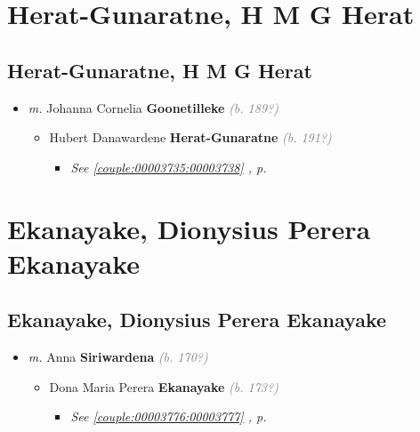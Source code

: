 \documentclass[10pt, openany]{book}
\begin{document}
\part{Herat-Gunaratne, H M G Herat}
\chapter{Herat-Gunaratne, H M G Herat}
\label{00003739}
\textcolor{slmaroon}{\textit{}}
\begin{itemize}
\item{\textit{m.} Johanna Cornelia \textbf{Goonetilleke} \textcolor{gray}{\textit{(b. 189?)}}   \label{couple:00003739:00003740} \begin{itemize}
\item{Hubert Danawardene \textbf{Herat-Gunaratne} \textcolor{gray}{\textit{(b. 191?)}}
\begin{itemize}
\item{\textcolor{slteal}{\textit{See  \autoref{couple:00003735:00003738} \textit{, p. \pageref{couple:00003735:00003738} }}}}
\end{itemize}
  }
\end{itemize}}
\end{itemize}
    
\part{Ekanayake, Dionysius Perera Ekanayake}
\chapter{Ekanayake, Dionysius Perera Ekanayake}
\label{00003778}
\textcolor{slmaroon}{\textit{}}
\begin{itemize}
\item{\textit{m.} Anna \textbf{Siriwardena} \textcolor{gray}{\textit{(b. 170?)}}   \label{couple:00003778:00003779} \begin{itemize}
\item{Dona Maria Perera \textbf{Ekanayake} \textcolor{gray}{\textit{(b. 173?)}}
\begin{itemize}
\item{\textcolor{slteal}{\textit{See  \autoref{couple:00003776:00003777} \textit{, p. \pageref{couple:00003776:00003777} }}}}
\end{itemize}
   }
\end{itemize}}
\end{itemize}
   
\end{document}
